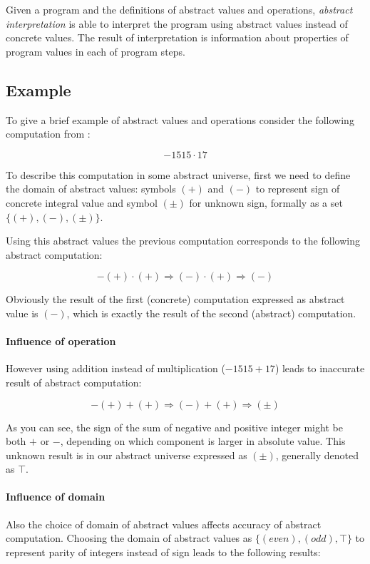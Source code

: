 \documentclass[12pt,oneside]{fithesis2}
\theoremstyle{definition}
\begin{document}
\vspace{1\baselineskip} %

Given a program and the definitions of abstract values and operations, \textit{abstract interpretation} is able to interpret the program using abstract values instead of concrete values. The result of interpretation is information about properties of program values in each of program steps.


\subsection{Example}\label{sec:example}

To give a brief example of abstract values and operations consider the following computation from \cite{CousotCousot77-1}:

\[ -1515 \cdot 17 \]

To describe this computation in some abstract universe, first we need to define the domain of abstract values: symbols $(+)$ and $(-)$ to represent sign of concrete integral value and symbol $(\pm)$ for unknown sign, formally as a set $\{(+), (-), (\pm)\}$.

Using this abstract values the previous computation corresponds to the following abstract computation:

\[ -(+) \cdot (+) \Rightarrow (-) \cdot (+) \Rightarrow (-) \]

Obviously the result of the first (concrete) computation expressed as abstract value is $(-)$, which is exactly the result of the second (abstract) computation.

\paragraph{Influence of operation}
However using addition instead of multiplication ($-1515 + 17$) leads to inaccurate result of abstract computation:

\[ -(+) + (+) \Rightarrow (-) + (+) \Rightarrow (\pm) \]

As you can see, the sign of the sum of negative and positive integer might be both $+$ or $-$, depending on which component is larger in absolute value. This unknown result is in our abstract universe expressed as $(\pm)$, generally denoted as $\top$.

\paragraph{Influence of domain}
Also the choice of domain of abstract values affects accuracy of abstract computation. Choosing the domain of abstract values as $\{(even), (odd), \top\}$ to represent parity of integers instead of sign leads to the following results:
\end{document}
